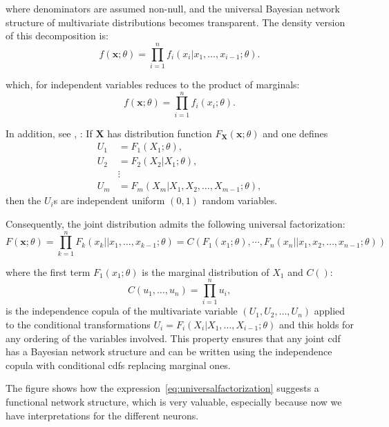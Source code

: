 \documentclass[
	11pt, %
	fleqn, %
	a4paper, %
]{LegrandOrangeBook}
\begin{document}
where denominators are assumed non-null, and the universal Bayesian network structure of multivariate distributions becomes transparent. The density version of this decomposition is:
\begin{equation}
f(\mathbf{x};\theta) = \prod_{i=1}^n f_i(x_i| x_1,\ldots, x_{i-1};\theta).
\label{eq:densityfactorization}
\end{equation}

which, for independent variables reduces to the product of marginals:
\begin{equation}
f(\mathbf{x};\theta) = \prod_{i=1}^n f_i(x_i;\theta).
\label{eq:independentfactorization}
\end{equation}

In addition, see \cite{Rosenblatt1952}, \cite{ArnoldCS:06}: If $\mathbf{X}$ has distribution function $F_{\mathbf{X}}(\mathbf{x};\theta)$ and one defines
\begin{align}
U_1 &= F_1(X_1;\theta), \\
U_2 &= F_2(X_2 | X_1;\theta), \\
&\vdots \\
U_m &= F_m(X_m | X_1,X_2,\ldots,X_{m-1};\theta),
\end{align}
then the $U_i$s are independent uniform $(0,1)$ random variables.

Consequently, the joint distribution admits the following universal factorization:
\begin{equation}
\boxed{F(\mathbf{x};\theta) = \prod_{k=1}^n F_k(x_k|| x_1,\ldots, x_{k-1};\theta) = C(F_1(x_1;\theta),\cdots,F_n(x_n||x_1, x_2,\ldots, x_{n-1};\theta))}
\label{eq:universalfactorization}
\end{equation}

where the first term $F_1(x_1;\theta)$ is the marginal distribution of $X_1$ and $C()$:
\begin{equation}
C(u_1,\ldots,u_n) = \prod_{i=1}^n u_i,
\label{eq:independencecopula}
\end{equation}
is the independence copula of the multivariate variable $(U_1,U_2,\ldots,U_n)$ applied to the conditional transformations $U_i = F_i(X_i | X_1,\ldots,X_{i-1};\theta)$ and this holds for any ordering of the variables involved. This property ensures that any joint cdf has a Bayesian network structure and can be written using the independence copula with conditional cdfs replacing marginal ones.

The figure shows how the expression~\eqref{eq:universalfactorization} suggests a functional network structure, which is very valuable, especially because now we have interpretations for the different neurons.
\end{document}
